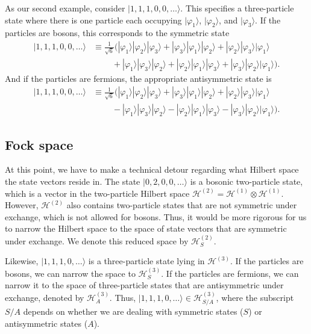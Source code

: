 \documentclass[pra,12pt]{revtex4}
\begin{document}
As our second example, consider $|1,1,1,0,0,\dots\rangle$.  This
specifies a three-particle state where there is one particle each
occupying $|\varphi_1\rangle$, $|\varphi_2\rangle$, and
$|\varphi_3\rangle$.  If the particles are bosons, this corresponds to
the symmetric state
$$\begin{aligned}|1,1,1,0,0,\dots\rangle &\equiv \frac{1}{\sqrt{6}}\Big(|\varphi_1\rangle|\varphi_2\rangle|\varphi_3\rangle + |\varphi_3\rangle|\varphi_1\rangle|\varphi_2\rangle + |\varphi_2\rangle|\varphi_3\rangle|\varphi_1\rangle \\&\;\qquad+ |\varphi_1\rangle|\varphi_3\rangle|\varphi_2\rangle + |\varphi_2\rangle|\varphi_1\rangle|\varphi_3\rangle + |\varphi_3\rangle|\varphi_2\rangle|\varphi_1\rangle \Big).
\end{aligned}$$
And if the particles are fermions, the appropriate antisymmetric state
is
$$\begin{aligned}|1,1,1,0,0,\dots\rangle &\equiv \frac{1}{\sqrt{6}} \Big(|\varphi_1\rangle|\varphi_2\rangle|\varphi_3\rangle + |\varphi_3\rangle|\varphi_1\rangle|\varphi_2\rangle + |\varphi_2\rangle|\varphi_3\rangle|\varphi_1\rangle \\&\;\qquad - |\varphi_1\rangle|\varphi_3\rangle|\varphi_2\rangle - |\varphi_2\rangle|\varphi_1\rangle|\varphi_3\rangle - |\varphi_3\rangle|\varphi_2\rangle|\varphi_1\rangle\Big).
\end{aligned}$$

\subsection{Fock space}

At this point, we have to make a technical detour regarding what
Hilbert space the state vectors reside in.  The state
$|0,2,0,0,\dots\rangle$ is a bosonic two-particle state, which is a
vector in the two-particle Hilbert space $\mathscr{H}^{(2)} =
\mathscr{H}^{(1)}\otimes \mathscr{H}^{(1)}$.  However,
$\mathscr{H}^{(2)}$ also contains two-particle states that are not
symmetric under exchange, which is not allowed for bosons.  Thus, it
would be more rigorous for us to narrow the Hilbert space to the space
of state vectors that are symmetric under exchange.  We denote this
reduced space by $\mathscr{H}^{(2)}_S$.

Likewise, $|1,1,1,0,\dots\rangle$ is a three-particle state lying in
$\mathscr{H}^{(3)}$.  If the particles are bosons, we can narrow the
space to $\mathscr{H}^{(3)}_S$.  If the particles are fermions, we can
narrow it to the space of three-particle states that are antisymmetric
under exchange, denoted by $\mathscr{H}^{(3)}_A$.  Thus,
$|1,1,1,0,\dots\rangle \in \mathscr{H}^{(3)}_{S/A}$, where the
subscript $S/A$ depends on whether we are dealing with symmetric
states ($S$) or antisymmetric states ($A$).
\end{document}
